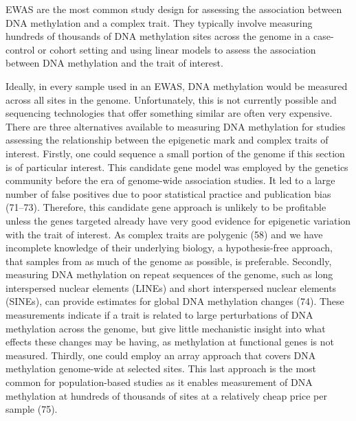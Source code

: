 \documentclass[11pt,twoside]{bristolthesis}
\begin{document}
EWAS are the most common study design for assessing the association between DNA methylation and a complex trait. They typically involve measuring hundreds of thousands of DNA methylation sites across the genome in a case-control or cohort setting and using linear models to assess the association between DNA methylation and the trait of interest.

Ideally, in every sample used in an EWAS, DNA methylation would be measured across all sites in the genome. Unfortunately, this is not currently possible and sequencing technologies that offer something similar are often very expensive. There are three alternatives available to measuring DNA methylation for studies assessing the relationship between the epigenetic mark and complex traits of interest. Firstly, one could sequence a small portion of the genome if this section is of particular interest. This candidate gene model was employed by the genetics community before the era of genome-wide association studies. It led to a large number of false positives due to poor statistical practice and publication bias (71--73). Therefore, this candidate gene approach is unlikely to be profitable unless the genes targeted already have very good evidence for epigenetic variation with the trait of interest. As complex traits are polygenic (58) and we have incomplete knowledge of their underlying biology, a hypothesis-free approach, that samples from as much of the genome as possible, is preferable. Secondly, measuring DNA methylation on repeat sequences of the genome, such as long interspersed nuclear elements (LINEs) and short interspersed nuclear elements (SINEs), can provide estimates for global DNA methylation changes (74). These measurements indicate if a trait is related to large perturbations of DNA methylation across the genome, but give little mechanistic insight into what effects these changes may be having, as methylation at functional genes is not measured. Thirdly, one could employ an array approach that covers DNA methylation genome-wide at selected sites. This last approach is the most common for population-based studies as it enables measurement of DNA methylation at hundreds of thousands of sites at a relatively cheap price per sample (75).
\end{document}
